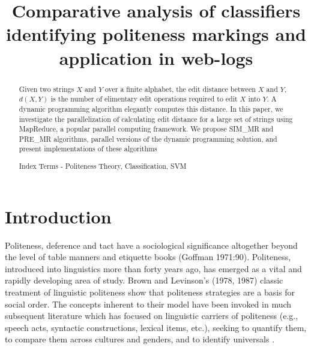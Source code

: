 \documentclass[conference]{IEEEtran}
\begin{document}
%
\title{Comparative analysis of classifiers identifying politeness markings and application in web-logs}


\author{
}




\maketitle
\thispagestyle{plain}
\pagestyle{plain}


\begin{abstract}
Given two strings $X$ and $Y$ over a finite alphabet, the edit distance between $X$ and $Y$, $d(X, Y)$ is the number of elimentary edit operations required to edit $X$ into $Y$. A dynamic programming algorithm elegantly computes this distance. In this paper, we investigate the parallelization of calculating edit distance for a large set of strings using MapReduce, a popular parallel computing framework. We propose SIM\_MR and PRE\_MR algorithms, parallel versions of the dynamic programming solution, and present implementations of these algorithms

Index Terms - Politeness Theory, Classification, SVM
\end{abstract}
\IEEEpeerreviewmaketitle


\section{Introduction}
Politeness, deference and tact have a sociological significance altogether beyond the level of table manners and etiquette books (Goffman 1971:90). Politeness, introduced into linguistics more than forty years ago, has emerged as a vital and rapidly developing area of study. Brown and Levinson's (1978, 1987) classic treatment of linguistic politeness show that politeness strategies are a basis for social order. The concepts inherent to their model have been invoked in much subsequent literature which has focused on linguistic carriers of politeness (e.g., speech acts, syntactic constructions, lexical items, etc.), seeking to quantify them, to compare them across cultures and genders, and to identify universals \cite{Meier}.
\end{document}
